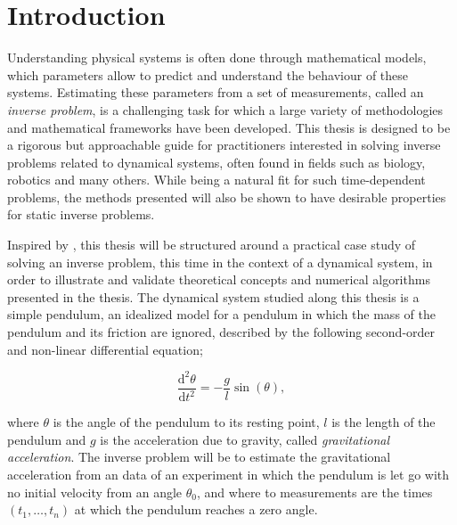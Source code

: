 \chapter{Introduction}
\setcounter{page}{1}
\thispagestyle{empty}

Understanding physical systems is often done through mathematical models, which parameters allow to predict and understand the behaviour of these systems. Estimating these parameters from a set of measurements, called an \textit{inverse problem}, is a challenging task for which a large variety of methodologies and mathematical frameworks have been developed. This thesis is designed to be a rigorous but approachable guide for practitioners interested in solving inverse problems related to dynamical systems, often found in fields such as biology, robotics and many others. While being a natural fit for such time-dependent problems, the methods presented will also be shown to have desirable properties for static inverse problems.

Inspired by \cite{bayes-tutorial}, this thesis will be structured around a practical case study of solving an inverse problem, this time in the context of a dynamical system, in order to illustrate and validate theoretical concepts and numerical algorithms presented in the thesis. The dynamical system studied along this thesis is a simple pendulum, an idealized model for a pendulum in which the mass of the pendulum and its friction are ignored, described by the following second-order and non-linear differential equation;

\begin{equation} \label{pendulum-diff-eq}
  \frac{\text{d}^2\theta}{\text{d}t^2} = -\frac{g}{l}\sin(\theta),
\end{equation}

where $\theta$ is the angle of the pendulum to its resting point, $l$ is the length of the pendulum and $g$ is the acceleration due to gravity, called \textit{gravitational acceleration}. The inverse problem will be to estimate the gravitational acceleration from an data of an experiment in which the pendulum is let go with no initial velocity from an angle $\theta_0$, and where to measurements are the times $(t_1, \ldots, t_n)$ at which the pendulum reaches a zero angle.

